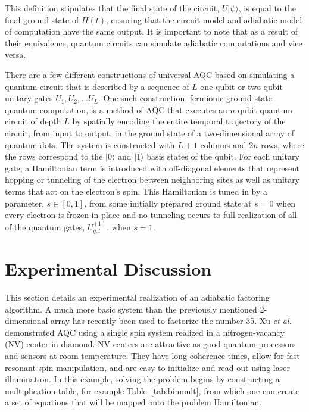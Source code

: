 \documentclass[%
 reprint,
 amsmath,amssymb,
 aps,
]{revtex4-1}
\begin{document}
   This definition stipulates that the final state of the circuit, $U\vert\psi\rangle$, is equal to the final ground state of $H(t)$, ensuring that the circuit model and adiabatic model of computation have the same output. It is important to note that as a result of their equivalence, quantum circuits can simulate adiabatic computations\cite{Farhi2000} and vice versa\cite{Aharanov2007}.
   
   There are a few different constructions of universal AQC based on simulating a quantum circuit that is described by a sequence of $L$ one-qubit or two-qubit unitary gates $U_1 , U_2 , ... U_L$. One such construction, fermionic ground state quantum computation, is a method of AQC that executes an $n$-qubit quantum circuit of depth $L$ by spatially encoding the entire temporal trajectory of the circuit, from input to output, in the ground state of a two-dimensional array of quantum dots\cite{Mizel2001}. The system is constructed with $L+1$ columns and $2n$ rows, where the rows correspond to the $\vert 0 \rangle$ and $\vert 1 \rangle$ basis states of the qubit. For each unitary gate, a Hamiltonian term is introduced with off-diagonal elements that represent hopping or tunneling of the electron between neighboring sites as well as unitary terms that act on the electron's spin. This Hamiltonian is tuned in by a parameter, $s \in [0,1]$, from some initially prepared ground state at $s=0$ when every electron is frozen in place and no tunneling occurs to full realization of all of the quantum gates, $U^{(1)}_{q,l}$, when $s=1$.
   
   \section{Experimental Discussion}\label{sec:B}
   
   This section details an experimental realization of an adiabatic factoring algorithm. A much more basic system than the previously mentioned 2-dimensional array has recently been used to factorize the number 35\cite{Xu2017}. Xu \textit{et al.} demonstrated AQC using a single spin system realized in a nitrogen-vacancy (NV) center in diamond. NV centers are attractive as good quantum processors and sensors at room temperature\cite{DOHERTY20131}. They have long coherence times, allow for fast resonant spin manipulation, and are easy to initialize and read-out using laser illumination. In this example, solving the problem begins by constructing a multiplication table, for example Table~\ref{tab:binmult}, from which one can create a set of equations that will be mapped onto the problem Hamiltonian.
   
\end{document}
